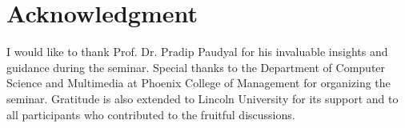 \documentclass[conference]{IEEEtran}
\begin{document}
\section*{Acknowledgment}
I would like to thank Prof. Dr. Pradip Paudyal for his invaluable insights and guidance during the seminar. Special thanks to the Department of Computer Science and Multimedia at Phoenix College of Management for organizing the seminar. Gratitude is also extended to Lincoln University for its support and to all participants who contributed to the fruitful discussions.
 


\end{document}
